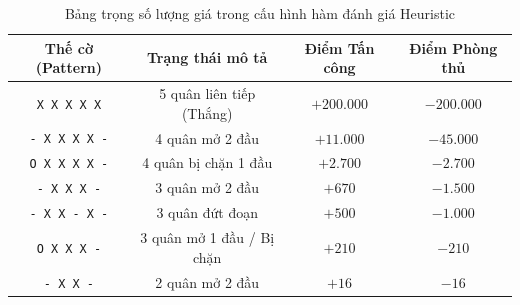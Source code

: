\begin{table}[!htbp]
	\centering
	\renewcommand{\arraystretch}{1.25}
	\caption{Bảng trọng số lượng giá trong cấu hình hàm đánh giá Heuristic}
	\label{tab:score_matrix}
	\begin{tabular}{|c|c|c|c|}
		\hline
		\textbf{Thế cờ (Pattern)} & \textbf{Trạng thái mô tả} & \textbf{Điểm Tấn công} & \textbf{Điểm Phòng thủ} \\ \hline
		\texttt{X X X X X} & 5 quân liên tiếp (Thắng) & $+200.000$ & $-200.000$ \\ \hline
		\texttt{- X X X X -} & 4 quân mở 2 đầu & $+11.000$ & $-45.000$ \\ \hline
		\texttt{O X X X X -} & 4 quân bị chặn 1 đầu & $+2.700$ & $-2.700$ \\ \hline
		\texttt{- X X X -} & 3 quân mở 2 đầu & $+670$ & $-1.500$ \\ \hline
		\texttt{- X X - X -} & 3 quân đứt đoạn & $+500$ & $-1.000$ \\ \hline
		\texttt{O X X X -} & 3 quân mở 1 đầu / Bị chặn & $+210$ & $-210$ \\ \hline
		\texttt{- X X -} & 2 quân mở 2 đầu & $+16$ & $-16$ \\ \hline
	\end{tabular}
\end{table}

